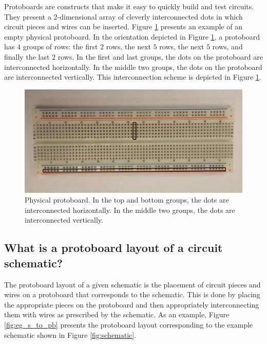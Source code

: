 Protoboards are constructs that make it easy to quickly build and test
circuits. They present a $2$-dimensional array of cleverly interconnected dots
in which circuit pieces and wires can be inserted. Figure
\ref{fig:physical_protoboard} presents an example of an empty physical
protoboard. In
the orientation depicted in Figure \ref{fig:physical_protoboard}, a protoboard
has $4$ groups of rows: the first $2$ rows, the next $5$ rows, the next $5$
rows, and finally the last $2$ rows. In the first and last groups, the dots on
the protoboard are interconnected horizontally. In the middle
two groups, the dots on the protoboard are interconnected vertically. This
interconnection scheme is depicted in Figure \ref{fig:physical_protoboard}.

\begin{figure}
\begin{center}
\includegraphics[width=\textwidth]{Images/physical_protoboard.jpg}
\caption{Physical protoboard. In the top and bottom groups, the dots are
interconnected horizontally. In the middle two groups, the dots are
interconnected vertically.}
\label{fig:physical_protoboard}
\end{center}
\end{figure}

\subsection{What is a protoboard layout of a circuit schematic?}

The protoboard layout of a given schematic is the placement of circuit pieces
and wires on a protoboard that corresponds to the schematic. This is done by
placing the appropriate pieces on the protoboard and then appropriately
interconnecting them with wires as prescribed by the schematic. As an example,
Figure \ref{fig:eg_s_to_pb} presents the protoboard layout corresponding to the
example schematic shown in Figure \ref{fig:schematic}.

